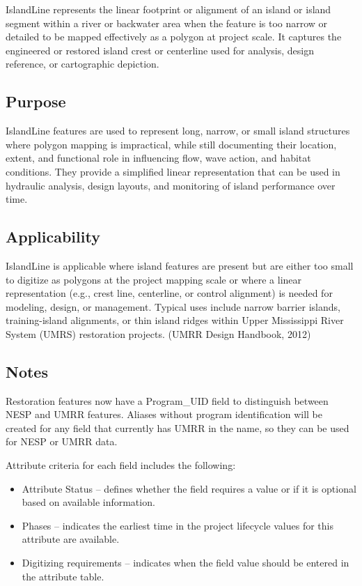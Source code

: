 \documentclass[
  letterpaper,
  DIV=11,
  numbers=noendperiod]{scrreprt}
\providecommand{\tightlist}{%
  \setlength{\itemsep}{0pt}\setlength{\parskip}{0pt}}
\begin{document}
IslandLine represents the linear footprint or alignment of an island or
island segment within a river or backwater area when the feature is too
narrow or detailed to be mapped effectively as a polygon at project
scale. It captures the engineered or restored island crest or centerline
used for analysis, design reference, or cartographic depiction.

\subsection{Purpose}\label{purpose-8}

IslandLine features are used to represent long, narrow, or small island
structures where polygon mapping is impractical, while still documenting
their location, extent, and functional role in influencing flow, wave
action, and habitat conditions. They provide a simplified linear
representation that can be used in hydraulic analysis, design layouts,
and monitoring of island performance over time.

\subsection{Applicability}\label{applicability-6}

IslandLine is applicable where island features are present but are
either too small to digitize as polygons at the project mapping scale or
where a linear representation (e.g., crest line, centerline, or control
alignment) is needed for modeling, design, or management. Typical uses
include narrow barrier islands, training-island alignments, or thin
island ridges within Upper Mississippi River System (UMRS) restoration
projects. (UMRR Design Handbook, 2012)

\subsection{Notes}\label{notes-8}

Restoration features now have a Program\_UID field to distinguish
between NESP and UMRR features. Aliases without program identification
will be created for any field that currently has UMRR in the name, so
they can be used for NESP or UMRR data.

Attribute criteria for each field includes the following:

\begin{itemize}
\tightlist
\item
  Attribute Status -- defines whether the field requires a value or if
  it is optional based on available information.
\item
  Phases -- indicates the earliest time in the project lifecycle values
  for this attribute are available.
\item
  Digitizing requirements -- indicates when the field value should be
  entered in the attribute table.
\end{itemize}
\end{document}
